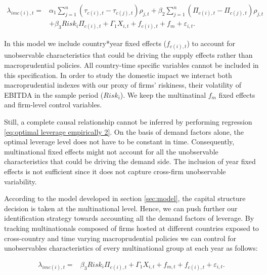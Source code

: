 \documentclass[12pt]{article}
\begin{document}
	\begin{equation}
	\begin{aligned}
	\lambda_{imc(i),t}=&\alpha_1\sum_{j=1}^{n}(\tau_{c(i),t}-\tau_{c(j),t})\rho_{j,t}+\beta_2\sum_{j=1}^{n}(\Pi_{c(i),t}-\Pi_{c(j),t})\rho_{j,t}\\
	&+\beta_3Risk_{i}\Pi_{c(i),t}+\Gamma_1 X_{i,t}+f_{c(i),t}+f_{m}+\varepsilon_{i,t}.
	\label{eq:optimal leverage empirically 2}
	\end{aligned}
	\end{equation}
	
	In this model we include country*year fixed effects ($f_{c(i),t}$) to account for unobservable characteristics that could be driving the supply effects rather than macroprudential policies. All country-time specific variables cannot be included in this specification. In order to study the domestic impact we interact both macroprudential indexes with our proxy of firms' riskiness, their volatility of EBITDA in the sample period ($Risk_{i}$). We keep the multinatinal $f_{m}$ fixed effects and firm-level control variables.  
	
	Still, a complete causal relationship cannot be inferred by performing regression \ref{eq:optimal leverage empirically 2}. On the basis of demand factors alone, the optimal leverage level does not have to be constant in time. Consequently, multinational fixed effects might not account for all the unobservable characteristics that could be driving the demand side. The inclusion of year fixed effects is not sufficient since it does not capture cross-firm unobservable variability.  
	
	According to the model developed in section \ref{sec:model}, the capital structure decision is taken at the multinational level. Hence, we can push further our identification strategy towards accounting all the demand factors of leverage. By tracking multinationals composed of firms hosted at different countries exposed to cross-country and time varying macroprudential policies we can control for unobservables characteristics of every multinational group at each year as follows:   
	
	\begin{equation}
	\begin{aligned}
	\lambda_{imc(i),t}=&\beta_3Risk_{i}\Pi_{c(i),t}+\Gamma_1 X_{i,t}+f_{m,t}+f_{c(i),t}+\varepsilon_{i,t}.
	\label{eq:optimal leverage empirically 3}
	\end{aligned}
	\end{equation}
	
\end{document}
